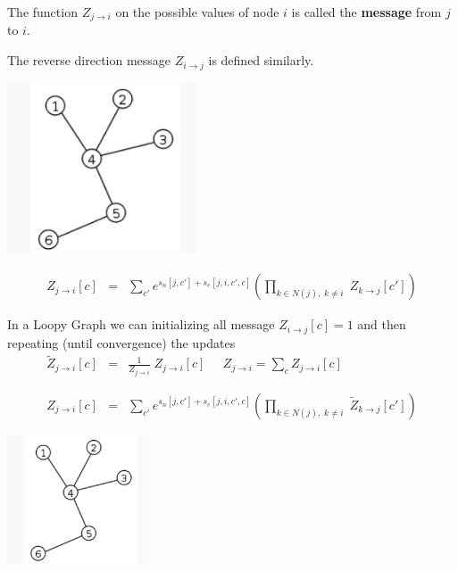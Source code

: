 {\vfill
The function $Z_{j \rightarrow i}$ on the possible values of node $i$ is called the {\bf message} from $j$ to $i$.

\vfill
The reverse direction message $Z_{i \rightarrow j}$ is defined similarly.


\centerline{\includegraphics[height=2.0in]{../images/Tree}}

\vfill
\begin{eqnarray*}
  Z_{j\rightarrow i}[c] & = & \sum_{c'}  e^{s_n[j,c'] + s_e[j,i,c',c]}
    \left(\prod_{k \in N(j),\;k \not = i}\;Z_{k\rightarrow j}[c']\right)
\end{eqnarray*}


In a Loopy Graph we can initializing all message $Z_{i \rightarrow j}[c] = 1$ and then repeating (until convergence) the updates
\vfill
\begin{eqnarray*}
  \tilde{Z}_{j \rightarrow i}[c] & = & \frac{1}{Z_{j \rightarrow i}}\;Z_{j \rightarrow i}[c] \;\;\;\;\;Z_{j \rightarrow i} = \sum_{c} Z_{j \rightarrow i}[c] \\
  \\
  \\
  Z_{j\rightarrow i}[c] & = & \sum_{c'}  e^{s_n[j,c'] + s_e[j,i,c',c]}
    \left(\prod_{k \in N(j),\;k \not = i}\;\tilde{Z}_{k\rightarrow j}[c']\right)
\end{eqnarray*}


\centerline{\includegraphics[height=1.5in]{../images/Tree}}

}
